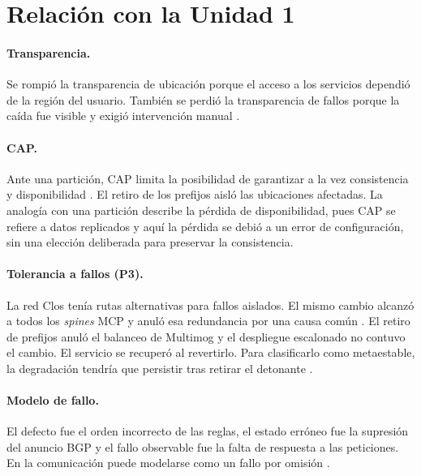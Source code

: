 \documentclass[10pt,a4paper]{article}
\begin{document}
\newpage
\section{Relación con la Unidad 1}
\paragraph{Transparencia.}
Se rompió la transparencia de ubicación porque el acceso a los servicios dependió de la región del usuario. También se perdió la transparencia de fallos porque la caída fue visible y exigió intervención manual \cite{cloudflare2022}.

\paragraph{CAP.}
Ante una partición, CAP limita la posibilidad de garantizar a la vez consistencia y disponibilidad \cite{gilbert2002,brewer2012}. El retiro de los prefijos aisló las ubicaciones afectadas. La analogía con una partición describe la pérdida de disponibilidad, pues CAP se refiere a datos replicados y aquí la pérdida se debió a un error de configuración, sin una elección deliberada para preservar la consistencia.

\paragraph{Tolerancia a fallos (P3).}
La red Clos tenía rutas alternativas para fallos aislados. El mismo cambio alcanzó a todos los \emph{spines} MCP y anuló esa redundancia por una causa común \cite{avizienis2004,cloudflare2022}. El retiro de prefijos anuló el balanceo de Multimog y el despliegue escalonado no contuvo el cambio. El servicio se recuperó al revertirlo. Para clasificarlo como metaestable, la degradación tendría que persistir tras retirar el detonante \cite{bronson2021}.

\paragraph{Modelo de fallo.}
El defecto fue el orden incorrecto de las reglas, el estado erróneo fue la supresión del anuncio BGP y el fallo observable fue la falta de respuesta a las peticiones. En la comunicación puede modelarse como un fallo por omisión \cite{avizienis2004,cloudflare2022}.
\end{document}
